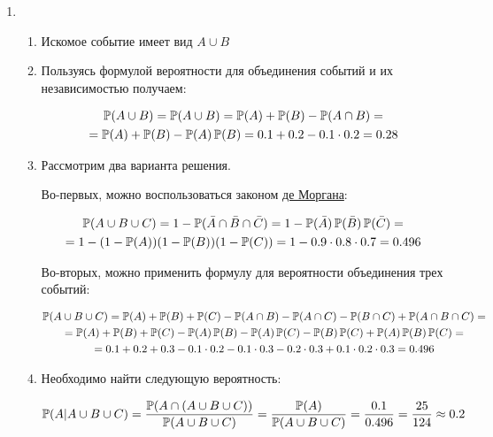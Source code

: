 \begin{enumerate}
	
	\item  
	\begin{enumerate}
	\item Искомое событие имеет вид $A\cup B$
	\item Пользуясь формулой вероятности для объединения событий и их независимостью получаем:
	
	\begin{multline*}
	\P(A\cup B)=\P(A\cup B)=\P(A)+\P(B)-\P(A\cap B)=\\
	=\P(A)+\P(B)-\P(A)\P(B)=0.1+0.2-0.1\cdot 0.2=0.28
	\end{multline*}
	\item Рассмотрим два варианта решения.
	
	Во-первых, можно воспользоваться законом \href{https://en.wikipedia.org/wiki/Augustus_De_Morgan}{де Моргана}:
	
	\begin{multline*}
	\P(A\cup B\cup C)=1-\P(\bar{A}\cap \bar{B}\cap \bar{C})=1-\P(\bar{A})\P(\bar{B})\P(\bar{C})= \\
	=1-(1-\P(A))(1-\P(B))(1-\P(C))=1-0.9\cdot 0.8 \cdot 0.7=0.496
	\end{multline*}
	
	Во-вторых, можно применить формулу для вероятности объединения трех событий:
	
	\begin{multline*}
	\P(A\cup B\cup C)=\P(A)+\P(B)+\P(C)-\P(A\cap B)-\P(A\cap C)-\P(B\cap C)+\P(A\cap B\cap C)=\\
	=\P(A)+\P(B)+\P(C)-\P(A)\P(B)-\P(A)\P(C)-\P(B)\P(C)+\P(A)\P(B)\P(C)=\\
	=0.1+0.2+0.3-0.1\cdot 0.2-0.1\cdot 0.3-0.2\cdot 0.3+0.1\cdot 0.2\cdot 0.3=0.496
	\end{multline*}
	
	\item Необходимо найти следующую вероятность:
	
	\[
	\P(A|A\cup B\cup C)=\frac{\P(A \cap (A \cup B \cup C))}{\P(A \cup B \cup C)}=\frac{\P(A)}{\P(A \cup B \cup C)}=\frac{0.1}{0.496}=\frac{25}{124}\approx0.2
	\]
	\end{enumerate}
	

\end{enumerate}
